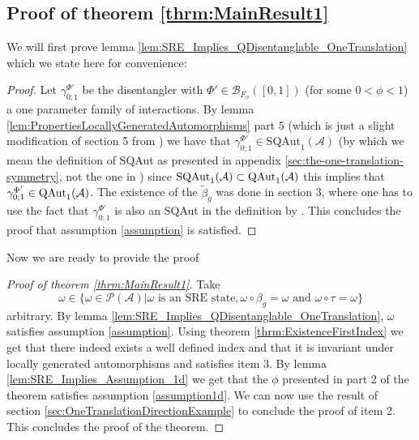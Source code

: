 \documentclass[12pt,a4paper,twoside]{article}
\let\originalleft\left
\let\originalright\right
\renewcommand{\left}{\mathopen{}\mathclose\bgroup\originalleft}
\renewcommand{\right}{\aftergroup\egroup\originalright}
\newcommand{\BB}{\mathcal B}
\newcommand{\PP}{\mathcal P}
\renewcommand{\AA}{\mathcal A}
\newcommand{\QAut}[1]{\textrm{QAut}_1\left(#1\right)}
\theoremstyle{definition}
\numberwithin{equation}{section}
\begin{document}
\subsection{Proof of theorem \ref{thrm:MainResult1}}\label{sec:ProofOfMainResult1}
We will first prove lemma \ref{lem:SRE_Implies_QDisentanglable_OneTranslation} which we state here for convenience:
\SREImpliesQDisentanglableOneTranslation*
\begin{proof}
	Let $\gamma^{\Phi'}_{0;1}$ be the disentangler with $\Phi'\in\BB_{F_\phi}([0,1])$ (for some $0<\phi<1$) a one parameter family of interactions. By lemma \ref{lem:PropertiesLocallyGeneratedAutomorphisms} part 5 (which is just a slight modification of section 5 from \cite{ogata2021h3gmathbb}) we have that $\gamma^{\Phi'}_{0;1}\in\textrm{SQAut}_1(\AA)$ (by which we mean the definition of SQAut as presented in appendix \ref{sec:the-one-translation-symmetry}, not the one in \cite{ogata2021h3gmathbb}) since $\textrm{SQAut}_1(\AA)\subset\QAut{\AA}$ this implies that $\gamma^{\Phi'}_{0;1}\in\QAut{\AA}$. The existence of the $\tilde{\beta}_g$ was done in \cite{ogata2021h3gmathbb} section 3, where one has to use the fact that $\gamma^{\Phi'}_{0;1}$ is also an SQAut in the definition by \cite{ogata2021h3gmathbb}. This concludes the proof that assumption \ref{assumption} is satisfied.
\end{proof}
Now we are ready to provide the proof
\begin{proof}[Proof of theorem \ref{thrm:MainResult1}]
	Take
	\begin{equation}
	\omega\in \{\omega\in\PP(\AA)|\omega\text{ is an SRE state},\omega\circ\beta_g=\omega\text{ and }\omega\circ\tau=\omega\}
	\end{equation}
	arbitrary. By lemma \ref{lem:SRE_Implies_QDisentanglable_OneTranslation}, $\omega$ satisfies assumption \ref{assumption}. Using theorem \ref{thrm:ExistenceFirstIndex} we get that there indeed exists a well defined index and that it is invariant under locally generated automorphisms and satisfies item 3. By lemma \ref{lem:SRE_Implies_Assumption_1d} we get that the $\phi$ presented in part 2 of the theorem satisfies assumption \ref{assumption1d}. We can now use the result of section \ref{sec:OneTranslationDirectionExample} to conclude the proof of item 2. This concludes the proof of the theorem.
\end{proof}

\end{document}
